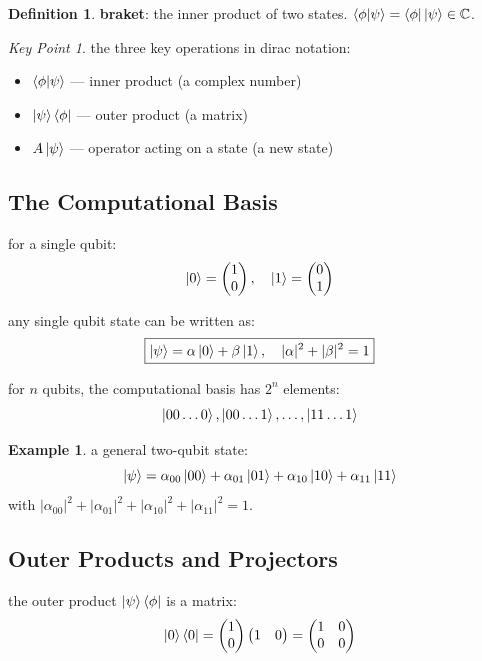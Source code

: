 \documentclass[11pt,a4paper]{article}
\theoremstyle{definition}
\newtheorem{definition}{Definition}[section]
\newtheorem{example}{Example}[section]
\theoremstyle{remark}
\newtheorem*{keypoint}{Key Point}
\begin{document}
\begin{definition}
\textbf{braket}: the inner product of two states. $\braket{\phi|\psi} = \bra{\phi}\ket{\psi} \in \mathbb{C}$.
\end{definition}

\begin{keypoint}
the three key operations in dirac notation:
\begin{itemize}
    \item $\braket{\phi|\psi}$ --- inner product (a complex number)
    \item $\ket{\psi}\bra{\phi}$ --- outer product (a matrix)
    \item $A\ket{\psi}$ --- operator acting on a state (a new state)
\end{itemize}
\end{keypoint}

\subsection{The Computational Basis}

for a single qubit:
\[
\ket{0} = \begin{pmatrix} 1 \\ 0 \end{pmatrix}, \quad \ket{1} = \begin{pmatrix} 0 \\ 1 \end{pmatrix}
\]

any single qubit state can be written as:
\[
\boxed{\ket{\psi} = \alpha\ket{0} + \beta\ket{1}, \quad |\alpha|^2 + |\beta|^2 = 1}
\]

for $n$ qubits, the computational basis has $2^n$ elements:
\[
\ket{00\ldots0}, \ket{00\ldots1}, \ldots, \ket{11\ldots1}
\]

\begin{example}
a general two-qubit state:
\[
\ket{\psi} = \alpha_{00}\ket{00} + \alpha_{01}\ket{01} + \alpha_{10}\ket{10} + \alpha_{11}\ket{11}
\]
with $|\alpha_{00}|^2 + |\alpha_{01}|^2 + |\alpha_{10}|^2 + |\alpha_{11}|^2 = 1$.
\end{example}

\subsection{Outer Products and Projectors}

the outer product $\ket{\psi}\bra{\phi}$ is a matrix:
\[
\ket{0}\bra{0} = \begin{pmatrix} 1 \\ 0 \end{pmatrix} \begin{pmatrix} 1 & 0 \end{pmatrix} = \begin{pmatrix} 1 & 0 \\ 0 & 0 \end{pmatrix}
\]
\end{document}
